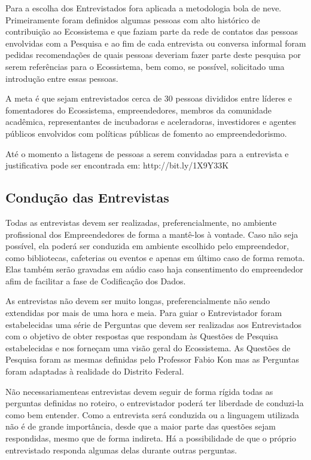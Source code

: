 Para a escolha dos Entrevistados fora aplicada a metodologia bola de neve. Primeiramente foram definidos algumas pessoas com alto histórico de contribuição ao Ecossistema e que faziam parte da rede de contatos das pessoas envolvidas com a Pesquisa e ao fim de cada entrevista ou conversa informal foram pedidas recomendações de quais pessoas deveriam fazer parte deste pesquisa por serem referências para o Ecossistema, bem como, se possível, solicitado uma introdução entre essas pessoas. 

A meta é que sejam entrevistados cerca de 30 pessoas divididos entre líderes e fomentadores do Ecossistema, empreendedores, membros da comunidade acadêmica, representantes de incubadoras e aceleradoras, investidores e agentes públicos envolvidos com políticas públicas de fomento ao empreendedorismo. 

Até o momento a listagens de pessoas a serem convidadas para a entrevista e justificativa pode ser encontrada em: http://bit.ly/1X9Y33K

\subsection{Condução das Entrevistas}
\label{subsection:conducao_das_entrevistas}

Todas as entrevistas devem ser realizadas, preferencialmente, no ambiente profissional dos Empreendedores de forma a mantê-los à vontade. Caso não seja possível, ela poderá ser conduzida em ambiente escolhido pelo empreendedor, como bibliotecas, cafeterias ou eventos e apenas em último caso de forma remota. Elas também serão gravadas em aúdio caso haja consentimento do empreendedor afim de facilitar a fase de Codificação dos Dados.

As entrevistas não devem ser muito longas, preferencialmente não sendo extendidas por mais de uma hora e meia. Para guiar o Entrevistador foram estabelecidas uma série de Perguntas que devem ser realizadas aos Entrevistados com o objetivo de obter respostas que respondam às Questões de Pesquisa estabelecidas e nos forneçam uma visão geral do Ecossistema. As Questões de Pesquisa foram as mesmas definidas pelo Professor Fabio Kon mas as Perguntas foram adaptadas à realidade do Distrito Federal.

Não necessariamenteas entrevistas devem seguir de forma rígida todas as perguntas definidas no roteiro, o entrevistador poderá ter liberdade de conduzi-la como bem entender. Como a entrevista será conduzida ou a linguagem utilizada não é de grande importância, desde que a maior parte das questões sejam respondidas, mesmo que de forma indireta. Há a possibilidade de que o próprio entrevistado responda algumas delas durante outras perguntas. 

